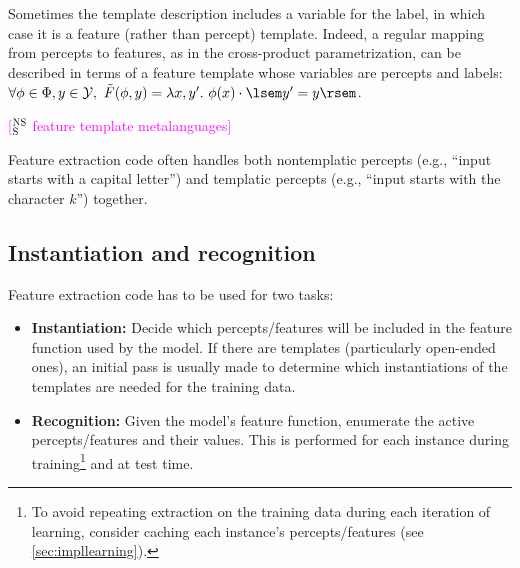 \documentclass[11pt,letterpaper]{article}
\newcommand{\ensuretext}[1]{#1}
\newcommand{\nssmarker}{\ensuretext{\textcolor{magenta}{\ensuremath{^{\textsc{NS}}_{\textsc{S}}}}}}
\newcommand{\arkcomment}[3]{\ensuretext{\textcolor{#3}{[#1 #2]}}}
\newcommand{\nss}[1]{\arkcomment{\nssmarker}{#1}{magenta}}
\begin{document}
Sometimes the template description includes a variable for the label, 
in which case it is a feature (rather than percept) template.
Indeed, a regular mapping from percepts to features, 
as in the cross-product parametrization, can be described in terms of a feature template 
whose variables are percepts and labels: 
$\forall \phi\in\Phi, y\in\mathcal{Y},\ \tilde{F}(\phi,y) = \lambda x,y'.\ \phi(x) \cdot \lsem y'=y \rsem$.

\nss{feature template metalanguages}

Feature extraction code often handles both nontemplatic percepts (e.g., ``input starts with a capital letter'') 
and templatic percepts (e.g., ``input starts with the character $k$'') together.

\subsection{Instantiation and recognition}\label{sec:inst}

Feature extraction code has to be used for two tasks:
\begin{itemize}
  \item \textbf{Instantiation:} 
  Decide which percepts\slash features will be included in the feature function used by the model. 
  If there are templates (particularly open-ended ones), an initial pass is usually made 
  to determine which instantiations of the templates are needed for the training data.
  \item \textbf{Recognition:} 
  Given the model's feature function, enumerate the active percepts\slash features and their values.
  This is performed for each instance during training\footnote{To avoid repeating extraction on the training data 
during each iteration of learning, consider caching each instance's percepts\slash features (see \cref{sec:impllearning}).} and at test time.
\end{itemize}
\end{document}
